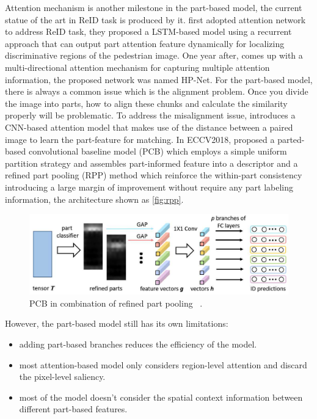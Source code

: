 Attention mechanism is another milestone in the part-based model, the current statue of the art in ReID task is produced by it.
\cite{end-to-end-attention-network-for-reid} first adopted attention network to address ReID task, they proposed a LSTM-based
model using a recurrent approach that can output part attention feature dynamically for localizing discriminative regions of
the pedestrian image. One year after, \cite{hpnet-attentive-deep-feature-for-reid} comes up with a multi-directional
attention mechanism for capturing multiple attention information, the proposed network was named HP-Net.
For the part-based model, there is always a common issue which is the alignment problem. Once you divide the image into parts,
how to align these chunks and calculate the similarity properly will be problematic. To address the misalignment issue,
\cite{part-aligned-for-reid} introduces a CNN-based attention model that makes use of the distance between a paired image to
learn the part-feature for matching. In ECCV2018, \cite{pcb-and-rpp-for-reid} proposed a parted-based convolutional
baseline model (PCB) which employs a simple uniform partition strategy and assembles part-informed feature into a descriptor
and a refined part pooling (RPP) method which reinforce the within-part consistency introducing a large margin of improvement
without require any part labeling information, the architecture shown as \autoref{fig:rpp}.

\begin{figure}
    \includegraphics[width=\linewidth]{figures/rpp.png}
    \caption{PCB in combination of refined part pooling ~\protect \cite{pcb-and-rpp-for-reid}.}
    \label{fig:rpp}
\end{figure}

However, the part-based model still has its own limitations:

\begin{itemize}
    \item adding part-based branches reduces the efficiency of the model.
    \item most attention-based model only considers region-level attention and discard the pixel-level saliency.
    \item most of the model doesn't consider the spatial context information between different part-based features.
\end{itemize}

